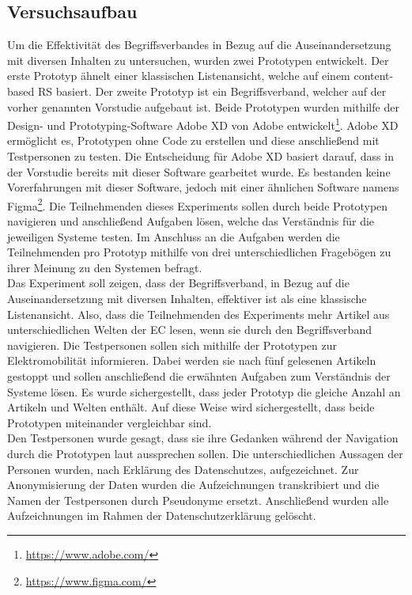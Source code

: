 \subsection{Versuchsaufbau}
Um die Effektivität des Begriffsverbandes in Bezug auf die Auseinandersetzung mit diversen Inhalten zu untersuchen, wurden zwei Prototypen entwickelt.
Der erste Prototyp ähnelt einer klassischen Listenansicht, welche auf einem content-based \ac{RS} basiert.
Der zweite Prototyp ist ein Begriffsverband, welcher auf der vorher genannten Vorstudie aufgebaut ist.
Beide Prototypen wurden mithilfe der Design- und Prototyping-Software Adobe XD von Adobe entwickelt\footnote{\url{https://www.adobe.com/}}.
Adobe XD ermöglicht es, Prototypen ohne Code zu erstellen und diese anschließend mit Testpersonen zu testen.
Die Entscheidung für Adobe XD basiert darauf, dass in der Vorstudie bereits mit dieser Software gearbeitet wurde.
Es bestanden keine Vorerfahrungen mit dieser Software, jedoch mit einer ähnlichen Software namens Figma\footnote{\url{https://www.figma.com/}}.
Die Teilnehmenden dieses Experiments sollen durch beide Prototypen navigieren und anschließend Aufgaben lösen, welche das Verständnis für die jeweiligen Systeme testen.
Im Anschluss an die Aufgaben werden die Teilnehmenden pro Prototyp mithilfe von drei unterschiedlichen Fragebögen zu ihrer Meinung zu den Systemen befragt.\\

Das Experiment soll zeigen, dass der Begriffsverband, in Bezug auf die Auseinandersetzung mit diversen Inhalten, effektiver ist als eine klassische Listenansicht.
Also, dass die Teilnehmenden des Experiments mehr Artikel aus unterschiedlichen Welten der \ac{EC} lesen, wenn sie durch den Begriffsverband navigieren.
Die Testpersonen sollen sich mithilfe der Prototypen zur Elektromobilität informieren.
Dabei werden sie nach fünf gelesenen Artikeln gestoppt und sollen anschließend die erwähnten Aufgaben zum Verständnis der Systeme lösen.
Es wurde sichergestellt, dass jeder Prototyp die gleiche Anzahl an Artikeln und Welten enthält.
Auf diese Weise wird sichergestellt, dass beide Prototypen miteinander vergleichbar sind.\\

Den Testpersonen wurde gesagt, dass sie ihre Gedanken während der Navigation durch die Prototypen laut aussprechen sollen.
Die unterschiedlichen Aussagen der Personen wurden, nach Erklärung des Datenschutzes, aufgezeichnet.
Zur Anonymisierung der Daten wurden die Aufzeichnungen transkribiert und die Namen der Testpersonen durch Pseudonyme ersetzt.
Anschließend wurden alle Aufzeichnungen im Rahmen der Datenschutzerklärung gelöscht.\\

